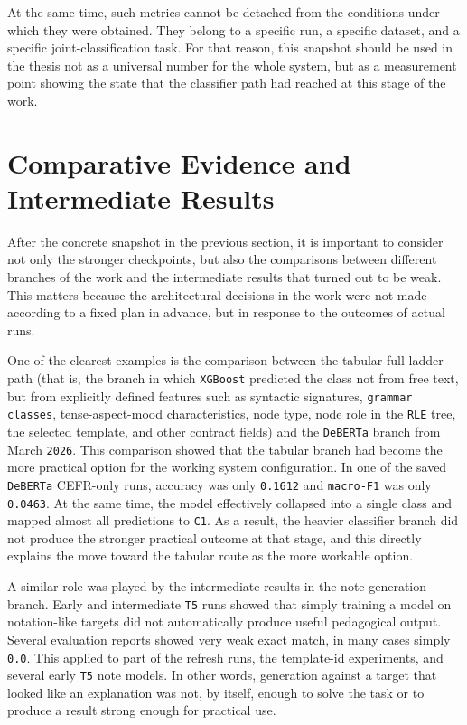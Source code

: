 \documentclass[12pt,a4paper,oneside]{report}
\begin{document}
At the same time, such metrics cannot be detached from the conditions under which they were obtained. They belong to a specific run, a specific dataset, and a specific joint-classification task. For that reason, this snapshot should be used in the thesis not as a universal number for the whole system, but as a measurement point showing the state that the classifier path had reached at this stage of the work.

\section{Comparative Evidence and Intermediate Results}
After the concrete snapshot in the previous section, it is important to consider not only the stronger checkpoints, but also the comparisons between different branches of the work and the intermediate results that turned out to be weak. This matters because the architectural decisions in the work were not made according to a fixed plan in advance, but in response to the outcomes of actual runs.

One of the clearest examples is the comparison between the tabular full-ladder path (that is, the branch in which \texttt{XGBoost} predicted the class not from free text, but from explicitly defined features such as syntactic signatures, \texttt{grammar classes}, tense-aspect-mood characteristics, node type, node role in the \texttt{RLE} tree, the selected template, and other contract fields) and the \texttt{DeBERTa} branch from March \texttt{2026}. This comparison showed that the tabular branch had become the more practical option for the working system configuration. In one of the saved \texttt{DeBERTa} CEFR-only runs, accuracy was only \texttt{0.1612} and \texttt{macro-F1} was only \texttt{0.0463}. At the same time, the model effectively collapsed into a single class and mapped almost all predictions to \texttt{C1}. As a result, the heavier classifier branch did not produce the stronger practical outcome at that stage, and this directly explains the move toward the tabular route as the more workable option.

A similar role was played by the intermediate results in the note-generation branch. Early and intermediate \texttt{T5} runs showed that simply training a model on notation-like targets did not automatically produce useful pedagogical output. Several evaluation reports showed very weak exact match, in many cases simply \texttt{0.0}. This applied to part of the refresh runs, the template-id experiments, and several early \texttt{T5} note models. In other words, generation against a target that looked like an explanation was not, by itself, enough to solve the task or to produce a result strong enough for practical use.
\end{document}
